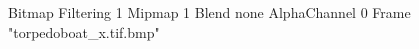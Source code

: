 {Bitmap
	{Filtering 1}
	{Mipmap 1}
	{Blend none}
	{AlphaChannel 0}
	{Frame "torpedoboat_x.tif.bmp"}
}
